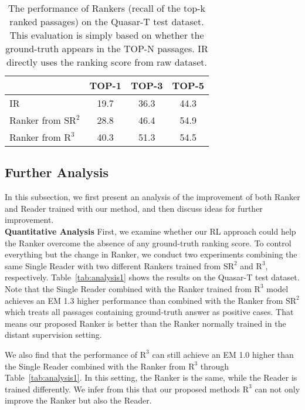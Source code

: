 \documentclass[letterpaper]{article} %
\begin{document}
\begin{table}[t]
\centering
\begin{tabular}{lccc}
\toprule
              & TOP-1 & TOP-3 & TOP-5 \\
\midrule
IR            & 19.7 & 36.3 & 44.3 \\
Ranker from $\text{SR}^2$ & 28.8 & 46.4 & 54.9 \\
Ranker from $\text{R}^3$  & 40.3 & 51.3 & 54.5 \\
 \bottomrule
\end{tabular}
\caption{The performance of Rankers (recall of the top-k ranked passages) on the Quasar-T test dataset. This evaluation is simply based on whether the ground-truth appears in the TOP-N passages. IR directly uses the ranking score from raw dataset.}
\label{tab:ranker_analysis}
\end{table}


\subsection{Further Analysis}
In this subsection, we first present an analysis of the improvement of both Ranker and Reader trained with our method, and then discuss ideas for further improvement.\\

\noindent\textbf{Quantitative Analysis}\quad
First, we examine whether our RL approach could help the Ranker overcome the absence of any ground-truth ranking score. To control everything but the change in Ranker, we conduct two experiments combining the same Single Reader with two different Rankers trained from $\text{SR}^2$ and $\text{R}^3$, respectively. Table~\ref{tab:analysis1} shows the results on the Quasar-T test dataset. Note that the Single Reader combined with the Ranker trained from $\text{R}^3$ model achieves an EM 1.3 higher performance than combined with the Ranker from $\text{SR}^2$ which treats all passages containing ground-truth answer as positive cases. That means our proposed Ranker is better than the Ranker normally trained in the distant supervision setting.

We also find that the performance of $\text{R}^3$ can still achieve an EM 1.0 higher than the Single Reader combined with the Ranker from $\text{R}^3$ through Table~\ref{tab:analysis1}. In this setting, the Ranker is the same, while the Reader is trained differently. We infer from this that our proposed methods $\text{R}^3$ can not only improve the Ranker but also the Reader. \\
\end{document}
